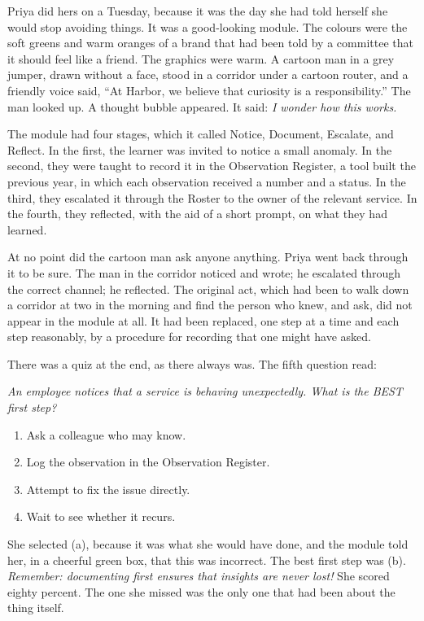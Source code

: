 Priya did hers on a Tuesday, because it was the day she had told herself she would stop avoiding things. It was a good-looking module. The colours were the soft greens and warm oranges of a brand that had been told by a committee that it should feel like a friend. The graphics were warm. A cartoon man in a grey jumper, drawn without a face, stood in a corridor under a cartoon router, and a friendly voice said, ``At Harbor, we believe that curiosity is a responsibility.'' The man looked up. A thought bubble appeared. It said: \emph{I wonder how this works.}

The module had four stages, which it called Notice, Document, Escalate, and Reflect. In the first, the learner was invited to notice a small anomaly. In the second, they were taught to record it in the Observation Register, a tool built the previous year, in which each observation received a number and a status. In the third, they escalated it through the Roster to the owner of the relevant service. In the fourth, they reflected, with the aid of a short prompt, on what they had learned.

At no point did the cartoon man ask anyone anything. Priya went back through it to be sure. The man in the corridor noticed and wrote; he escalated through the correct channel; he reflected. The original act, which had been to walk down a corridor at two in the morning and find the person who knew, and ask, did not appear in the module at all. It had been replaced, one step at a time and each step reasonably, by a procedure for recording that one might have asked.

There was a quiz at the end, as there always was. The fifth question read:

\emph{An employee notices that a service is behaving unexpectedly. What is the BEST first step?}

\begin{enumerate}
\def\labelenumi{(\alph{enumi})}
\tightlist
\item
  Ask a colleague who may know.
\item
  Log the observation in the Observation Register.
\item
  Attempt to fix the issue directly.
\item
  Wait to see whether it recurs.
\end{enumerate}

She selected (a), because it was what she would have done, and the module told her, in a cheerful green box, that this was incorrect. The best first step was (b). \emph{Remember: documenting first ensures that insights are never lost!} She scored eighty percent. The one she missed was the only one that had been about the thing itself.

